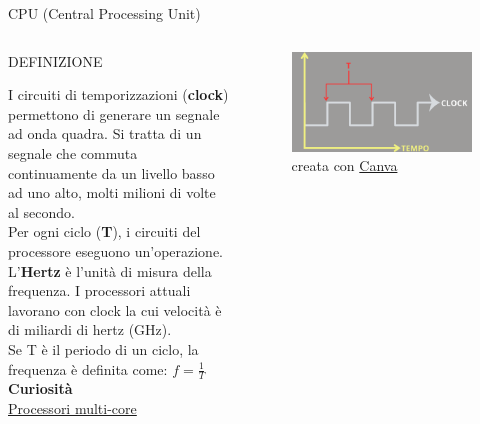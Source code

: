 \documentclass[aspectratio=1610]{beamer}
\begin{document}
\begin{frame}{CPU (Central Processing Unit)}
    \begin{columns}
            \begin{alertblock}{DEFINIZIONE}
                \begin{minipage}{0.96\linewidth}
                    \justifying
                    I circuiti di temporizzazioni (\textbf{clock}) permettono di generare un segnale ad 
                    onda quadra. Si tratta di un segnale che commuta continuamente da un 
                    livello basso ad uno alto, molti milioni di volte al secondo.\\
                    Per ogni ciclo (\textbf{T}), i circuiti del processore eseguono un'operazione.\\
                    L'\textbf{Hertz} è l'unità di misura della frequenza. I processori attuali 
                    lavorano con clock la cui velocità è di miliardi di hertz (GHz).\\
                    Se T è il periodo di un ciclo, la frequenza è definita come: $f=\frac{1}{T}$\\
                    \bigskip
                    \tiny{\textbf{Curiosità}}\\
                    \tiny{\href{https://www.fastweb.it/fastweb-plus/digital-magazine/processori-multi-core-cosa-sono-e-come-funzionano/}{Processori multi-core}}
                \end{minipage}
            \end{alertblock}
            \begin{figure}
                \includegraphics[width=\linewidth]{img/clock.png}
                \caption{{creata con \href{https://www.canva.com}{Canva}}}
            \end{figure}
    \end{columns}
\end{frame}
\end{document}

